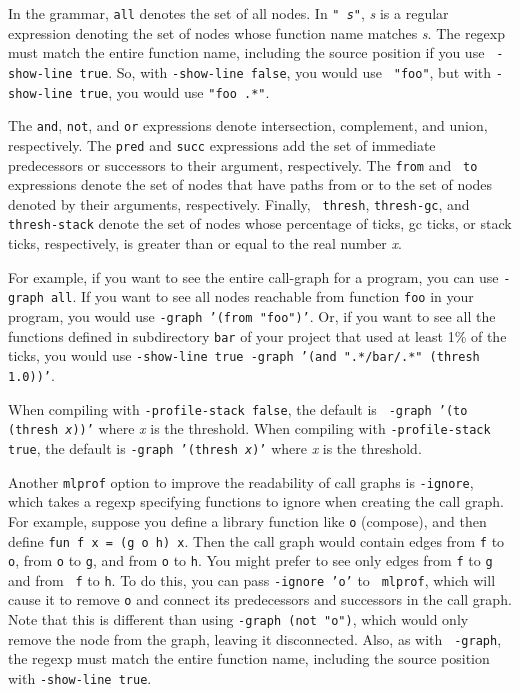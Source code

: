 In the grammar, {\tt all} denotes the set of all nodes.  In {\tt "{\it
s}"}, {\it s} is a regular expression denoting the set of nodes whose
function name matches {\it s}.  The regexp must match the entire
function name, including the source position if you use {\tt
-show-line true}.  So, with {\tt -show-line false}, you would use {\tt
"foo"}, but with {\tt -show-line true}, you would use {\tt "foo .*"}.

The {\tt and}, {\tt not}, and {\tt or} expressions denote
intersection, complement, and union, respectively.  The {\tt pred} and
{\tt succ} expressions add the set of immediate predecessors or
successors to their argument, respectively.  The {\tt from} and {\tt
to} expressions denote the set of nodes that have paths from or to the
set of nodes denoted by their arguments, respectively.  Finally, {\tt
thresh}, {\tt thresh-gc}, and {\tt thresh-stack} denote the set of
nodes whose percentage of ticks, gc ticks, or stack ticks,
respectively, is greater than or equal to the real number {\it x}.

For example, if you want to see the entire call-graph for a program,
you can use {\tt -graph all}.  If you want to see all nodes reachable
from function {\tt foo} in your program, you would use {\tt -graph
'(from "foo")'}.  Or, if you want to see all the functions defined in
subdirectory {\tt bar} of your project that used at least 1\% of the
ticks, you would use {\tt -show-line true -graph '(and ".*/bar/.*"
(thresh 1.0))'}.

When compiling with {\tt -profile-stack false}, the default is {\tt
-graph '(to (thresh {\it x}))'} where {\it x} is the threshold.  When
compiling with {\tt -profile-stack true}, the default is {\tt -graph
'(thresh {\it x})'} where {\it x} is the threshold.

Another {\tt mlprof} option to improve the readability of call graphs
is {\tt -ignore}, which takes a regexp specifying functions to ignore
when creating the call graph.  For example, suppose you define a
library function like {\tt o} (compose), and then define {\tt fun f x
= (g o h) x}.  Then the call graph would contain edges from {\tt f} to
{\tt o}, from {\tt o} to {\tt g}, and from {\tt o} to {\tt h}.  You
might prefer to see only edges from {\tt f} to {\tt g} and from {\tt
f} to {\tt h}.  To do this, you can pass {\tt -ignore 'o'} to {\tt
mlprof}, which will cause it to remove {\tt o} and connect its
predecessors and successors in the call graph.  Note that this is
different than using {\tt -graph (not "o")}, which would only remove
the node from the graph, leaving it disconnected.  Also, as with {\tt
-graph}, the regexp must match the entire function name, including the
source position with {\tt -show-line true}.

